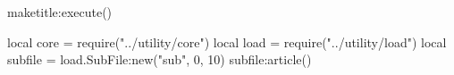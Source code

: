 \documentclass[11pt, a4paper]{article}
\begin{document}
    \begin{luacode*}
        maketitle:execute()
    \end{luacode*}

    \tableofcontents

    \begin{luacode*}
        local core = require("../utility/core")
        local load = require("../utility/load")
        local subfile = load.SubFile:new("sub", 0, 10)
        subfile:article()
    \end{luacode*}

    
    
\end{document}
